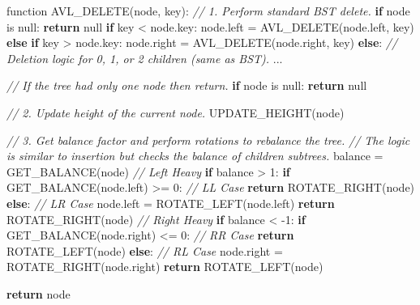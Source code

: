 \documentclass[
]{article}
\newenvironment{Shaded}{}{}
\newcommand{\CommentTok}[1]{\textcolor[rgb]{0.38,0.63,0.69}{\textit{#1}}}
\newcommand{\ControlFlowTok}[1]{\textcolor[rgb]{0.00,0.44,0.13}{\textbf{#1}}}
\newcommand{\DecValTok}[1]{\textcolor[rgb]{0.25,0.63,0.44}{#1}}
\newcommand{\NormalTok}[1]{#1}
\begin{document}
\begin{pcode}

\begin{Shaded}
\begin{Highlighting}[]
\NormalTok{function AVL\_DELETE(node, key):}
  \CommentTok{// 1. Perform standard BST delete.}
  \ControlFlowTok{if}\NormalTok{ node is null: }\ControlFlowTok{return}\NormalTok{ null}
  \ControlFlowTok{if}\NormalTok{ key \textless{} node.key:}
\NormalTok{    node.left = AVL\_DELETE(node.left, key)}
  \ControlFlowTok{else} \ControlFlowTok{if}\NormalTok{ key \textgreater{} node.key:}
\NormalTok{    node.right = AVL\_DELETE(node.right, key)}
  \ControlFlowTok{else}\NormalTok{:}
    \CommentTok{// Deletion logic for 0, 1, or 2 children (same as BST).}
\NormalTok{    ...}

  \CommentTok{// If the tree had only one node then return.}
  \ControlFlowTok{if}\NormalTok{ node is null: }\ControlFlowTok{return}\NormalTok{ null}

  \CommentTok{// 2. Update height of the current node.}
\NormalTok{  UPDATE\_HEIGHT(node)}

  \CommentTok{// 3. Get balance factor and perform rotations to rebalance the tree.}
  \CommentTok{// The logic is similar to insertion but checks the balance of children subtrees.}
\NormalTok{  balance = GET\_BALANCE(node)}
  \CommentTok{// Left Heavy}
  \ControlFlowTok{if}\NormalTok{ balance \textgreater{} }\DecValTok{1}\NormalTok{:}
    \ControlFlowTok{if}\NormalTok{ GET\_BALANCE(node.left) \textgreater{}= }\DecValTok{0}\NormalTok{: }\CommentTok{// LL Case}
      \ControlFlowTok{return}\NormalTok{ ROTATE\_RIGHT(node)}
    \ControlFlowTok{else}\NormalTok{: }\CommentTok{// LR Case}
\NormalTok{      node.left = ROTATE\_LEFT(node.left)}
      \ControlFlowTok{return}\NormalTok{ ROTATE\_RIGHT(node)}
  \CommentTok{// Right Heavy}
  \ControlFlowTok{if}\NormalTok{ balance \textless{} {-}}\DecValTok{1}\NormalTok{:}
    \ControlFlowTok{if}\NormalTok{ GET\_BALANCE(node.right) \textless{}= }\DecValTok{0}\NormalTok{: }\CommentTok{// RR Case}
      \ControlFlowTok{return}\NormalTok{ ROTATE\_LEFT(node)}
    \ControlFlowTok{else}\NormalTok{: }\CommentTok{// RL Case}
\NormalTok{      node.right = ROTATE\_RIGHT(node.right)}
      \ControlFlowTok{return}\NormalTok{ ROTATE\_LEFT(node)}

  \ControlFlowTok{return}\NormalTok{ node}
\end{Highlighting}
\end{Shaded}

\end{pcode}
\end{document}
